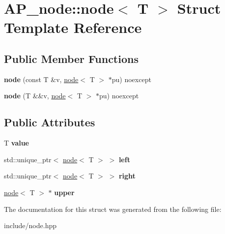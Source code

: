 \hypertarget{structAP__node_1_1node}{}\section{A\+P\+\_\+node\+:\+:node$<$ T $>$ Struct Template Reference}
\label{structAP__node_1_1node}
\subsection*{Public Member Functions}
\begin{DoxyCompactItemize}
\item 
\mbox{\label{structAP__node_1_1node_a364c333ccf25b7f1c4ac766a23e86ee6}} 
{\bfseries node} (const T \&v, \hyperlink{structAP__node_1_1node}{node}$<$ T $>$ $\ast$pu) noexcept
\item 
\mbox{\label{structAP__node_1_1node_a548c79adaea5073dccf7283a7a511aac}} 
{\bfseries node} (T \&\&v, \hyperlink{structAP__node_1_1node}{node}$<$ T $>$ $\ast$pu) noexcept
\end{DoxyCompactItemize}
\subsection*{Public Attributes}
\begin{DoxyCompactItemize}
\item 
\mbox{\label{structAP__node_1_1node_abbde5206a54167ba046551879f409134}} 
T {\bfseries value}
\item 
\mbox{\label{structAP__node_1_1node_adde34e7c4d3d99dc9515c0c38e117e0a}} 
std\+::unique\+\_\+ptr$<$ \hyperlink{structAP__node_1_1node}{node}$<$ T $>$ $>$ {\bfseries left}
\item 
\mbox{\label{structAP__node_1_1node_ab55fa203db8ddff7144bb2e4c1a336fc}} 
std\+::unique\+\_\+ptr$<$ \hyperlink{structAP__node_1_1node}{node}$<$ T $>$ $>$ {\bfseries right}
\item 
\mbox{\label{structAP__node_1_1node_acadd81185b4232098b48eb317e105007}} 
\hyperlink{structAP__node_1_1node}{node}$<$ T $>$ $\ast$ {\bfseries upper}
\end{DoxyCompactItemize}


The documentation for this struct was generated from the following file\+:\begin{DoxyCompactItemize}
\item 
include/node.\+hpp\end{DoxyCompactItemize}

